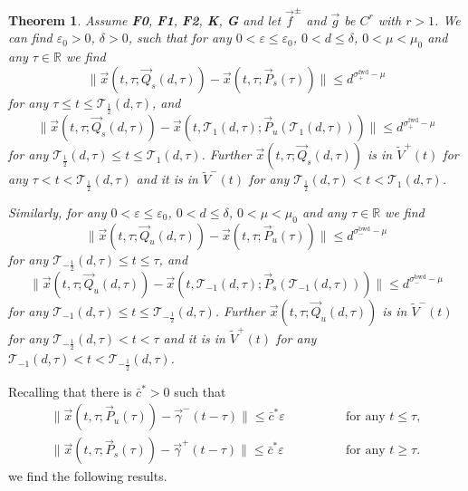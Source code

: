 \documentclass[10pt]{article}
\newtheorem{knowntheorem}{Theorem}
\numberwithin{equation}{section}
\def\sbwd{\sigma^{\textrm{bwd}}}
\def\sfwd{\sigma^{\textrm{fwd}}}
\def\sbwd{\sigma^{\textrm{bwd}}}
\def\ga{\vec{\gamma}}
\def\ep{\varepsilon}
\def\R{{\mathbb R}}
\def\TTT{\mathscr{T}}
\def\Q{\vec{Q}}
\def\P{\vec{P}}
\def\x{\vec{x}}
\def\f{\vec{f}}
\def\g{\vec{g}}
\newcommand\assump[1]{{\rm\textbf{#1}}}
\theoremstyle{definition}
\theoremstyle{remark}
\begin{document}
\begin{knowntheorem}\label{keymissed}\cite[Theorem 4.3]{CFPRimut}
Assume \assump{F0}, \assump{F1}, \assump{F2}, \assump{K}, \assump{G}  and    let $\f^\pm$ and $\g$ be $C^r$ with $r>1$.
We can find $\ep_0>0$, $\delta>0$,  such that for any $0<\ep \le \ep_0$,   $0<d \le \delta$,   $0< \mu <\mu_0$   and any $\tau \in \R$
   we find
  \begin{equation}\label{keymissed.es-}
   \|\x(t,\tau; \Q_s(d,\tau))-\x(t,\tau; \P_s(\tau))\| \le  d^{\sfwd_+ - \mu }
  \end{equation}
  for any $\tau \le t \le \TTT_{\frac{1}{2}}(d,\tau)$,   and
  \begin{equation}\label{keymissed.es+}
  \|\x(t,\tau; \Q_s(d,\tau))-\x(t,\TTT_1(d,\tau); \P_u(\TTT_1(d,\tau)))\| \le  d^{\sfwd_+ - \mu }
  \end{equation}
    for any $\TTT_{\frac{1}{2}}(d,\tau) \le t \le \TTT_1(d,\tau)$.
    Further   $\x(t,\tau; \Q_s(d,\tau))$ is in  $\tilde{V}^+(t)$  for any $\tau<t<
\mathscr{T}_{\frac{1}{2}}(d,\tau)$ and it is
in
$\tilde{V}^-(t)$ for any $\mathscr{T}_{\frac{1}{2}}(d,\tau)<t< \mathscr{T}_{1}(d,\tau)$.

Similarly, for any $0<\ep \le \ep_0$,   $0<d \le \delta$,   $0< \mu <\mu_0$   and any $\tau \in \R$  we find
\begin{equation}\label{keymissed.eu+}
	\|\x(t,\tau; \Q_u(d,\tau))-\x(t,\tau; \P_u(\tau))\| \le  d^{\sbwd_- - \mu}
\end{equation}
  for any $   \TTT_{-\frac{1}{2}}(d,\tau)  \le t \le \tau$,    and
\begin{equation}\label{keymissed.eu-}
	\|\x(t,\tau; \Q_u(d,\tau))-\x(t,\TTT_{-1}(d,\tau); \P_s(\TTT_{-1}(d,\tau)))\| \le  d^{\sbwd_- - \mu}
\end{equation}
    for any $\TTT_{-1}(d,\tau) \le t \le \TTT_{-\frac{1}{2}}(d,\tau)$.
    Further $\x(t,\tau; \Q_u(d,\tau))$ is in  $\tilde{V}^-(t)$  for any $
\mathscr{T}_{-\frac{1}{2}}(d,\tau)<t<\tau$
and it is in  $\tilde{V}^+(t)$  for any $\mathscr{T}_{-1}(d,\tau)<t< \mathscr{T}_{-\frac{1}{2}}(d,\tau)$.
\end{knowntheorem}


Recalling that there is $\bar{c}^*>0$ such that
   \begin{equation}\label{trajWuWs}
   \begin{split}
      \| \x(t,\tau ; \P_u(\tau)) -\ga^-(t-\tau) \| \le \bar{c}^* \ep & \qquad \qquad \textrm{for any $t \le \tau$}, \\
        \| \x(t,\tau ; \P_s(\tau)) -\ga^+(t-\tau) \| \le \bar{c}^* \ep & \qquad \qquad \textrm{for any $t \ge \tau$}.
   \end{split}
 \end{equation}
 we find the following results.
\end{document}
